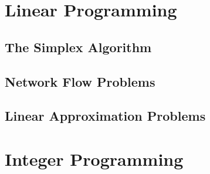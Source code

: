 \section{Linear Programming}\label{sec:lp}
\label{sec:lp-overview}

\subsection{The Simplex Algorithm}\label{sec:simplex}


\subsection{Network Flow Problems}\label{sec:xportation}


\subsection{Linear Approximation Problems}\label{sec:approx}


\section{Integer Programming}\label{sec:ip}

